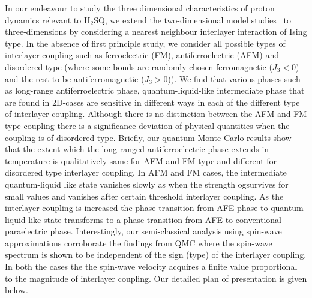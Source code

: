 \indent In our endeavour to study the three dimensional characteristics of proton dynamics relevant to $\text{H}_2\text{SQ}$, we extend the two-dimensional model studies~\cite{chern2014gauge, vijigiri2018classical} to three-dimensions by considering a nearest neighbour interlayer interaction of Ising type.
In the absence of first principle study, we consider all possible types of interlayer coupling such as ferroelectric (FM), antiferroelectric (AFM) and disordered type (where some bonds are randomly chosen ferromagnetic ($J_3 < 0$) and the rest to be antiferromagnetic ($ J_3 > 0$)).  We find that various phases such as long-range  antiferroelectric phase, quantum-liquid-like intermediate phase that are found in 2D-cases \cite{vijigiri2020dipole,ishizuka2011quantum} are sensitive in different ways in each of the different type of interlayer coupling. Although there is no distinction between the AFM and FM type coupling there is a significance deviation of physical quantities when the coupling is of disordered type. Briefly, our quantum Monte Carlo results show that the extent which the long ranged antiferroelectric phase extends in temperature is qualitatively same for AFM and FM type and different for disordered type interlayer coupling. In AFM and FM cases, the intermediate quantum-liquid like state vanishes slowly as when the strength ogsurvives for small values and vanishes after certain threshold interlayer coupling. As the interlayer coupling is increased the phase transition from AFE phase to quantum liquid-like state transforms to a phase transition from AFE to conventional paraelectric phase. Interestingly, our semi-classical analysis using spin-wave approximations corroborate the findings from QMC where the spin-wave spectrum is shown to be independent of the sign (type) of the interlayer coupling. In both the cases the the spin-wave velocity acquires a finite value proportional to the magnitude of interlayer coupling. Our detailed plan of presentation is given below.\\
